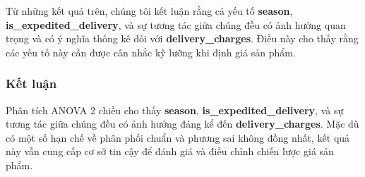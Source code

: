  Từ những kết quả trên, chúng tôi kết luận rằng cả yếu tố \textbf{season}, \textbf{is\_expedited\_delivery}, và sự tương tác giữa chúng đều có ảnh hưởng quan trọng và có ý nghĩa thống kê đối với \textbf{delivery\_charges}. Điều này cho thấy rằng các yếu tố này cần được cân nhắc kỹ lưỡng khi định giá sản phẩm.
               
        
\subsubsection{Kết luận}
Phân tích ANOVA 2 chiều cho thấy \textbf{season}, \textbf{is\_expedited\_delivery}, và sự tương tác giữa chúng đều có ảnh hưởng đáng kể đến \textbf{delivery\_charges}. Mặc dù có một số hạn chế về phân phối chuẩn và phương sai không đồng nhất, kết quả này vẫn cung cấp cơ sở tin cậy để đánh giá và điều chỉnh chiến lược giá sản phẩm.